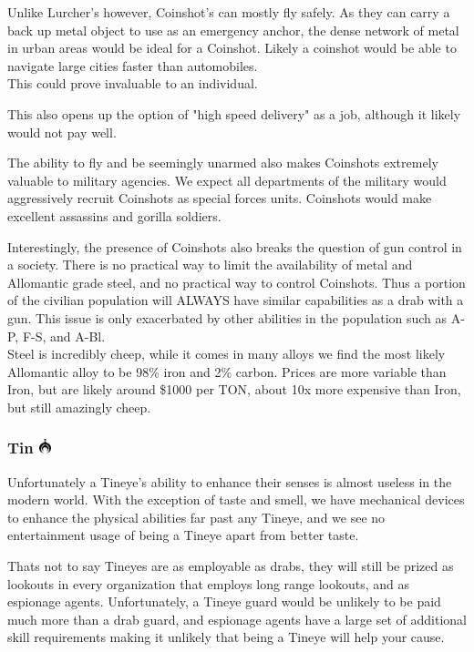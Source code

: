 \documentclass[conference]{IEEEtran}
\newcommand{\n}{\hfill\break}
\begin{document}
	Unlike Lurcher's however, Coinshot's can mostly fly safely.  As they can carry a back up metal object to use as an emergency anchor, the dense network of metal in urban areas would be ideal for a Coinshot.  Likely a coinshot would be able to navigate large cities faster than automobiles. \\This could prove invaluable to an individual.
\n

This also opens up the option of "high speed delivery" as a job, although it likely would not pay well.\n

The ability to fly and be seemingly unarmed also makes Coinshots extremely valuable to military agencies.  We expect all departments of the military would aggressively recruit Coinshots as special forces units.  Coinshots would make excellent assassins and gorilla soldiers.\n

Interestingly, the presence of Coinshots also breaks the question of gun control in a society.  There is no practical way to limit the availability of metal and Allomantic grade steel, and no practical way to control Coinshots.  Thus a portion of the civilian population will ALWAYS have similar capabilities as a drab with a gun.  This issue is only exacerbated by other abilities in the population such as A-P, F-S, and A-Bl.\\\n
Steel is incredibly cheep, while it comes in many alloys we find the most likely Allomantic alloy to be 98\% iron and 2\% carbon.  Prices are more variable than Iron, but are likely around \$1000 per TON, about 10x more expensive than Iron, but still amazingly cheep.\n

	\subsubsection{\textbf{Tin}        \includegraphics[height=1em]{images/Tin.png}}\label{sec:mistings:tin}
	Unfortunately a Tineye's ability to enhance their senses is almost useless in the modern world.  With the exception of taste and smell, we have mechanical devices to enhance the physical abilities far past any Tineye, and we see no entertainment usage of being a Tineye apart from better taste.\n
	
	Thats not to say Tineyes are as employable as drabs, they will still be prized as lookouts in every organization that employs long range lookouts, and as espionage agents.  Unfortunately, a Tineye guard would be unlikely to be paid much more than a drab guard, and espionage agents have a large set of additional skill requirements making it unlikely that being a Tineye will help your cause.
	
\end{document}
